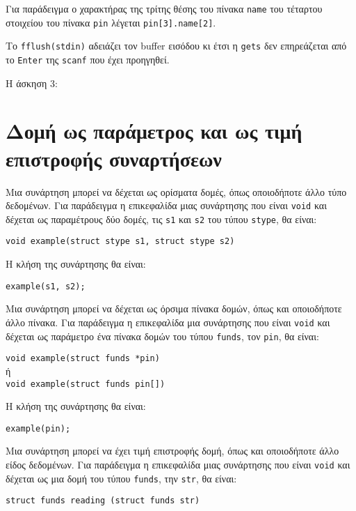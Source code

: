 \documentclass[14pt, fleqn, leqno]{extreport}
\begin{document}
Για παράδειγμα ο χαρακτήρας της τρίτης θέσης του πίνακα \lstinline{name} του τέταρτου στοιχείου του πίνακα \lstinline{pin} λέγεται \lstinline{pin[3].name[2]}.

Το \lstinline{fflush(stdin)} αδειάζει τον buffer εισόδου κι έτσι η \lstinline{gets} δεν επηρεάζεται από το \lstinline{Enter} της \lstinline{scanf} που έχει προηγηθεί.

\newpage
Η άσκηση 3:


\section{Δομή ως παράμετρος και ως τιμή επιστροφής συναρτήσεων}

Μια συνάρτηση μπορεί να δέχεται ως ορίσματα δομές, όπως οποιοδήποτε άλλο τύπο δεδομένων. Για παράδειγμα η επικεφαλίδα μιας συνάρτησης που είναι \lstinline{void} και δέχεται ως παραμέτρους δύο δομές, τις \lstinline{s1} και \lstinline{s2} του τύπου \lstinline{stype}, θα είναι:
\begin{center}
    \lstinline{void example(struct stype s1, struct stype s2)}
\end{center}

Η κλήση της συνάρτησης θα είναι:
\begin{center}
    \lstinline{example(s1, s2);}
\end{center}

Μια συνάρτηση μπορεί να δέχεται ως όρσιμα πίνακα δομών, όπως και οποιοδήποτε άλλο πίνακα. Για παράδειγμα η επικεφαλίδα μια συνάρτησης που είναι \lstinline{void} και δέχεται ως παράμετρο ένα πίνακα δομών του τύπου \lstinline{funds}, τον \lstinline{pin}, θα είναι:
\begin{center}
    \lstinline{void example(struct funds *pin)}\\
    ή\\
    \lstinline{void example(struct funds pin[])}
\end{center}

Η κλήση της συνάρτησης θα είναι:
\begin{center}
    \lstinline{example(pin);}
\end{center}

Μια συνάρτηση μπορεί να έχει τιμή επιστροφής δομή, όπως και οποιοδήποτε άλλο είδος δεδομένων. Για παράδειγμα η επικεφαλίδα μιας συνάρτησης που είναι \lstinline{void} και δέχεται ως μια δομή του τύπου \lstinline{funds}, την \lstinline{str}, θα είναι:
\begin{center}
    \lstinline{struct funds reading (struct funds str)}
\end{center}
\end{document}

